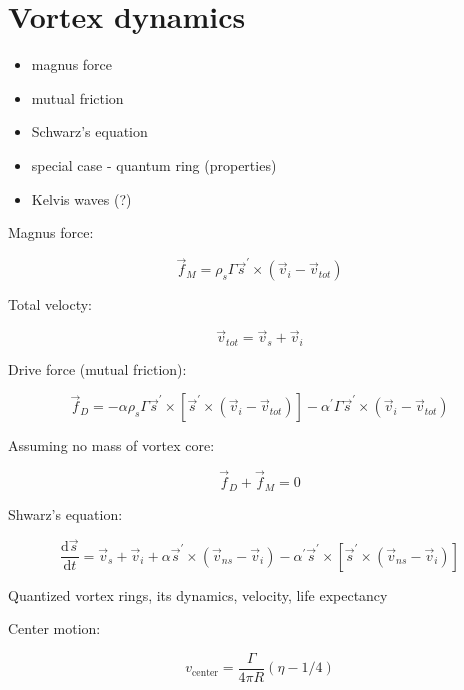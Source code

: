 \section{Vortex dynamics}
\begin{itemize}
	\item magnus force
	\item mutual friction
	\item Schwarz's equation
	\item special case - quantum ring (properties)
	\item Kelvis waves (?)
\end{itemize}

Magnus force:

\begin{equation}
\vec{f}_M = \rho_s \Gamma \vec{s}^{\prime} \times (\vec{v}_i - \vec{v}_{tot})
\end{equation}

Total velocty:

\begin{equation}
\vec{v}_{tot} = \vec{v}_s + \vec{v}_i
\end{equation}


Drive force (mutual friction):

\begin{equation}
\vec{f}_D = - \alpha\rho_s\Gamma\vec{s}^{\prime} \times [\vec{s}^{\prime} \times (\vec{v}_i - \vec{v}_{tot})] - \alpha^{\prime}\Gamma\vec{s}^{\prime} \times (\vec{v}_i - \vec{v}_{tot})
\end{equation}

Assuming no mass of vortex core:

\begin{equation}
\vec{f}_D + \vec{f}_M = 0
\end{equation}

Shwarz's equation:

\begin{equation}
\frac{\text{d}\vec{s}}{\text{d}t} = \vec{v}_s + \vec{v}_i + \alpha\vec{s}^{\prime} \times (\vec{v}_{ns} - \vec{v}_i) - \alpha^{\prime}\vec{s}^{\prime} \times [\vec{s}^{\prime} \times (\vec{v}_{ns} - \vec{v}_i)]
\end{equation}

Quantized vortex rings, its dynamics, velocity, life expectancy

Center motion:

\begin{equation}
v_{\text{center}} = \frac{\Gamma}{4\pi R} (\eta - 1/4)
\end{equation}


